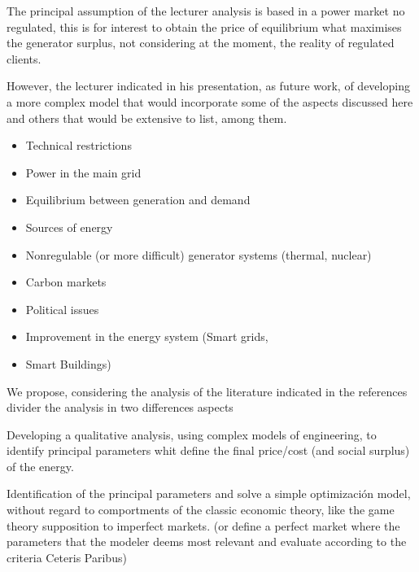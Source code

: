 \documentclass{article}
\begin{document}
The principal assumption of the lecturer analysis is based in a power market no regulated, this is for interest to obtain the price of equilibrium what maximises the generator surplus, not considering at the moment, the reality of regulated clients.

However, the lecturer indicated in his presentation, as future work, of developing a more complex model that would incorporate some of the aspects discussed here and others that would be extensive to list, among them.

\begin{itemize}
    \item Technical restrictions
    \item Power in the main grid
    \item Equilibrium between generation and demand
    \item Sources of energy
    \item Nonregulable (or more difficult) generator systems (thermal, nuclear)
    \item Carbon markets
    \item Political issues
    \item Improvement in the energy system (Smart grids, \item Smart Buildings)
\end{itemize}

We propose, considering the analysis of the literature indicated in the references divider the analysis in two differences aspects

Developing a qualitative analysis, using complex models of engineering, to identify principal parameters whit define the final price/cost (and social surplus) of the energy.

Identification of the principal parameters and solve a simple optimización model,  without regard to comportments of the classic economic theory, like the game theory supposition to imperfect markets. (or define a perfect market where the parameters that the modeler deems most relevant and evaluate according to the criteria Ceteris Paribus)

  \nocite{*}
    
\end{document}
